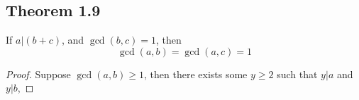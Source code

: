 \documentclass[../../main.tex]{subfiles}
\begin{document}
\subsection{Theorem 1.9}
\begin{wts}
    If $a|(b+c)$, and $\gcd(b,c)=1$, then
    \[
    \gcd(a,b) = \gcd(a,c) = 1
    \]
\end{wts}
\begin{proof}
    Suppose $\gcd(a,b)\geq 1$, then there exists some $y\geq 2$ such that $y|a$ and $y|b$,
\end{proof}
\end{document}
